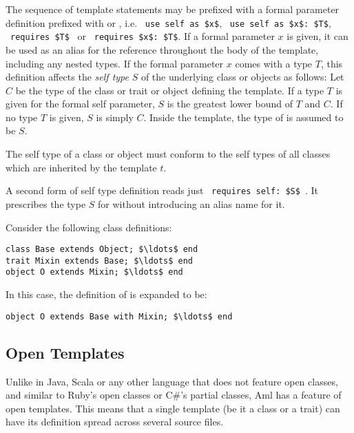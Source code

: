 The sequence of template statements may be prefixed with a formal parameter definition prefixed with  or , i.e. ~\lstinline!use self as $x$!, ~\lstinline!use self as $x$: $T$!, ~\lstinline!requires $T$!~ or ~\lstinline!requires $x$: $T$!. If a formal parameter $x$ is given, it can be used as an alias for the reference  throughout the body of the template, including any nested types. If the formal parameter $x$ comes with a type $T$, this definition affects the {\em self type} $S$ of the underlying class or objects as follows: Let $C$ be the type of the class or trait or object defining the template. If a type $T$ is given for the formal self parameter, $S$ is the greatest lower bound of $T$ and $C$. If no type $T$ is given, $S$ is simply $C$. Inside the template, the type of  is assumed to be $S$. 

The self type of a class or object must conform to the self types of all classes which are inherited by the template $t$. 

A second form of self type definition reads just ~\lstinline!requires self: $S$!~. It prescribes the type $S$ for  without introducing an alias name for it. 


\example Consider the following class definitions:
\begin{lstlisting}
class Base extends Object; $\ldots$ end
trait Mixin extends Base; $\ldots$ end
object O extends Mixin; $\ldots$ end
\end{lstlisting}
In this case, the definition of  is expanded to be:
\begin{lstlisting}
object O extends Base with Mixin; $\ldots$ end
\end{lstlisting}





\subsection{Open Templates}
\label{sec:open-templates}

Unlike in Java, Scala or any other language that does not feature open classes, and similar to Ruby's open classes or C\#'s partial classes, Aml has a feature of open templates. This means that a single template (be it a class or a trait) can have its definition spread across several source files. 

